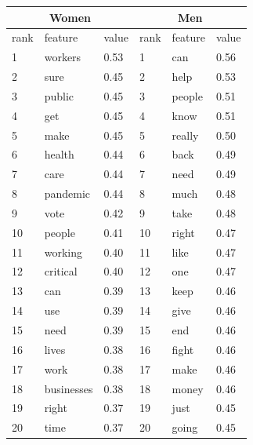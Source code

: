     \begin{tabular}{l|l|l|l|l|l}
    \hline
            \multicolumn{3}{c}{Women}&\multicolumn{3}{c}{Men}\\\hline
        rank & feature & value & rank & feature & value \\\hline
        1 & workers & 0.53 & 1 & can & 0.56 \\ 
        2 & sure & 0.45 & 2 & help & 0.53 \\ 
        3 & public & 0.45 & 3 & people & 0.51 \\ 
        4 & get & 0.45 & 4 & know & 0.51 \\
        5 & make & 0.45 & 5 & really & 0.50 \\ 
        6 & health & 0.44 & 6 & back & 0.49 \\ 
        7 & care & 0.44 & 7 & need & 0.49 \\ 
        8 & pandemic & 0.44 & 8 & much & 0.48 \\ 
        9 & vote & 0.42 & 9 & take & 0.48 \\ 
        10 & people & 0.41 & 10 & right & 0.47 \\
        11 & working & 0.40 & 11 & like & 0.47 \\ 
        12 & critical & 0.40 & 12 & one & 0.47 \\ 
        13 & can & 0.39 & 13 & keep & 0.46 \\ 
        14 & use & 0.39 & 14 & give & 0.46 \\
        15 & need & 0.39 & 15 & end & 0.46 \\ 
        16 & lives & 0.38 & 16 & fight & 0.46 \\ 
        17 & work & 0.38 & 17 & make & 0.46 \\ 
        18 & businesses & 0.38 & 18 & money & 0.46 \\ 
        19 & right & 0.37 & 19 & just & 0.45 \\ 
        20 & time & 0.37 & 20 & going & 0.45 \\ \hline
    \end{tabular}